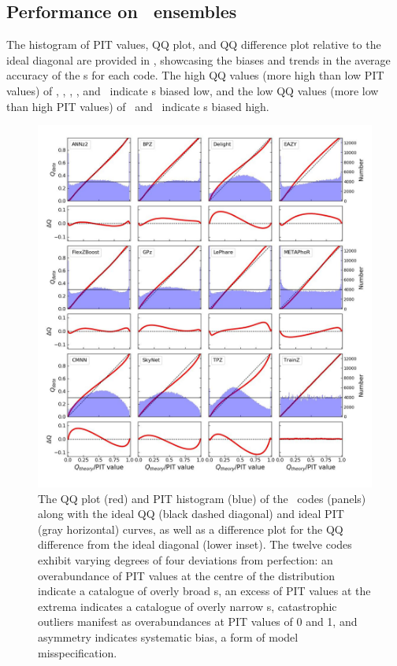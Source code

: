 \subsection{Performance on \pzpdf\ ensembles}

The histogram of PIT values, QQ plot, and QQ difference plot relative to the ideal diagonal are provided in , showcasing the biases and trends in the average accuracy of the \pzpdf s for each code.
The high QQ values (more high than low PIT values) of \bpz, \cmnn, \delight, \eazy, and \gpz\ indicate \pzpdf s biased low, and the low QQ values (more low than high PIT values) of \skynet\ and \tpz\ indicate \pzpdf s biased high.

\begin{figure}
	\centering
	\includegraphics[width=\textwidth]{figures/pzdc1/PITANDQQplot_12codes_crop.jpg}
	\caption{The QQ plot (red) and PIT histogram (blue) of the \pzpdf\ codes (panels) along with the ideal QQ (black dashed diagonal) and ideal PIT (gray horizontal) curves, as well as a difference plot for the QQ difference from the ideal diagonal (lower inset).
		The twelve codes exhibit varying degrees of four deviations from perfection: an overabundance of PIT values at the centre of the distribution indicate a catalogue of overly broad \pzpdf s, an excess of PIT values at the extrema indicates a catalogue of overly narrow \pzpdf s, catastrophic outliers manifest as overabundances at PIT values of 0 and 1, and asymmetry indicates systematic bias, a form of model misspecification.}
\end{figure}


